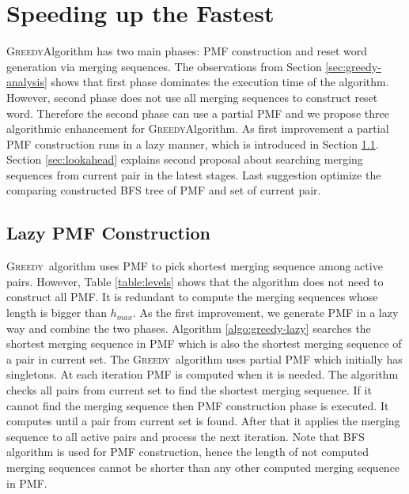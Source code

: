 \documentclass[12pt]{article}
\newcommand{\greedyAlgo}{\textsc{Greedy}}
\begin{document}
\clearpage
\section{Speeding up the Fastest}
\label{sec:speedup}

\greedyAlgo \space Algorithm has two main phases: PMF construction and reset word generation via merging sequences. The observations from Section \ref{sec:greedy-analysis} shows that first phase dominates the execution time of the algorithm. However, second phase does not use all merging sequences to construct reset word. Therefore the second phase can use a partial PMF and we propose three algorithmic enhancement for \greedyAlgo \space Algorithm. As first improvement a partial PMF construction runs in a lazy manner, which is introduced in Section \ref{sec:lazy}. Section \ref{sec:lookahead} explains second proposal about searching merging sequences from current pair in the latest stages. Last suggestion optimize the comparing constructed BFS tree of PMF and set of current pair.  

\subsection{Lazy PMF Construction}
\label{sec:lazy}

\greedyAlgo~algorithm uses PMF to pick shortest merging sequence among active pairs. However, Table \ref{table:levels} shows that the algorithm does not need to construct all PMF. It is redundant to compute the merging sequences whose length is bigger than $h_{max}$. As the first improvement, we generate PMF in a lazy way and combine the two phases. Algorithm \ref{algo:greedy-lazy} searches the shortest merging sequence in PMF which is also the shortest merging sequence of a pair in current set. The \greedyAlgo~algorithm uses partial PMF which initially has singletons. At each iteration PMF is computed when it is needed. The algorithm checks all pairs from current set to find the shortest merging sequence. If it cannot find the merging sequence then PMF construction phase is executed. It computes until a pair from current set is found. After that it applies the merging sequence to all active pairs and process the next iteration. Note that BFS algorithm is used for PMF construction, hence the length of not computed merging sequences cannot be shorter than any other computed merging sequence in PMF.
 
\end{document}
